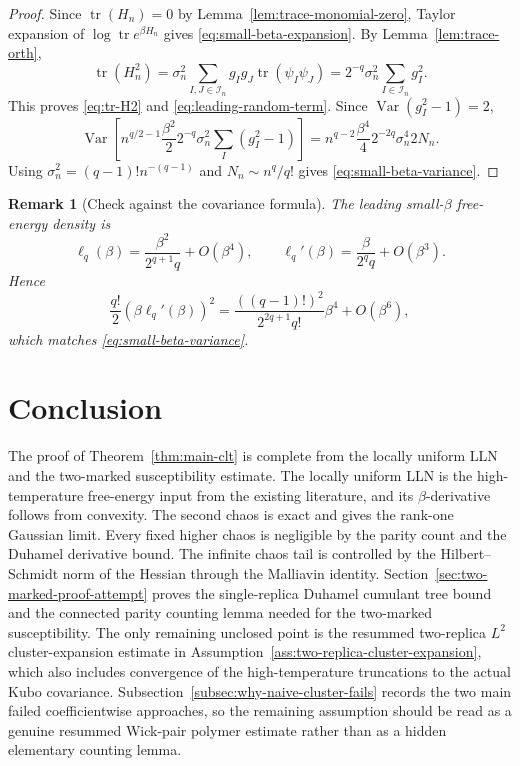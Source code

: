 \documentclass[11pt]{article}
\newtheorem{remark}[theorem]{Remark}
\newcommand{\Var}{\operatorname{Var}}
\newcommand{\tr}{\operatorname{tr}}
\newcommand{\calI}{\mathcal{I}}
\begin{document}
\begin{proof}
  Since $\tr(H_n)=0$ by Lemma~\ref{lem:trace-monomial-zero}, Taylor expansion of
  $\log\tr e^{\beta H_n}$ gives \eqref{eq:small-beta-expansion}.  By
  Lemma~\ref{lem:trace-orth},
  \begin{equation}\label{eq:tr-H2-proof}
    \tr(H_n^2)
    =
    \sigma_n^2\sum_{I,J\in\calI_n}g_Ig_J\tr(\psi_I\psi_J)
    =
    2^{-q}\sigma_n^2\sum_{I\in\calI_n}g_I^2.
  \end{equation}
  This proves \eqref{eq:tr-H2} and \eqref{eq:leading-random-term}.  Since
  $\Var(g_I^2-1)=2$,
  \begin{equation}\label{eq:small-beta-var-proof}
    \Var\left[
      n^{q/2-1}
      \frac{\beta^2}{2}2^{-q}\sigma_n^2
      \sum_I(g_I^2-1)
    \right]
    =
    n^{q-2}\frac{\beta^4}{4}2^{-2q}\sigma_n^4 2N_n.
  \end{equation}
  Using $\sigma_n^2=(q-1)!n^{-(q-1)}$ and $N_n\sim n^q/q!$ gives
  \eqref{eq:small-beta-variance}.
\end{proof}

\begin{remark}[Check against the covariance formula]
  The leading small-$\beta$ free-energy density is
  \begin{equation}\label{eq:ell-small-beta}
    \ell_q(\beta)=\frac{\beta^2}{2^{q+1}q}+O(\beta^4),
    \qquad
    \ell_q'(\beta)=\frac{\beta}{2^q q}+O(\beta^3).
  \end{equation}
  Hence
  \begin{equation}\label{eq:covariance-small-beta-match}
    \frac{q!}{2}(\beta\ell_q'(\beta))^2
    =
    \frac{((q-1)!)^2}{2^{2q+1}q!}\beta^4+O(\beta^6),
  \end{equation}
  which matches \eqref{eq:small-beta-variance}.
\end{remark}

\section{Conclusion}

The proof of Theorem~\ref{thm:main-clt} is complete from the locally uniform
LLN and the two-marked susceptibility estimate.  The locally uniform LLN is the
high-temperature free-energy input from the existing literature, and its
$\beta$-derivative follows from convexity.  The second chaos is exact and gives
the rank-one Gaussian limit.  Every fixed higher chaos is negligible by the
parity count and the Duhamel derivative bound.  The infinite chaos tail is
controlled by the Hilbert--Schmidt norm of the Hessian through the Malliavin
identity.  Section~\ref{sec:two-marked-proof-attempt} proves the
single-replica Duhamel cumulant tree bound and the connected parity counting
lemma needed for the two-marked susceptibility.  The only remaining unclosed
point is the resummed two-replica $L^2$ cluster-expansion estimate in
Assumption~\ref{ass:two-replica-cluster-expansion}, which also includes
convergence of the high-temperature truncations to the actual Kubo covariance.
Subsection~\ref{subsec:why-naive-cluster-fails} records the two main failed
coefficientwise approaches, so the remaining assumption should be read as a
genuine resummed Wick-pair polymer estimate rather than as a hidden elementary
counting lemma.
\end{document}
